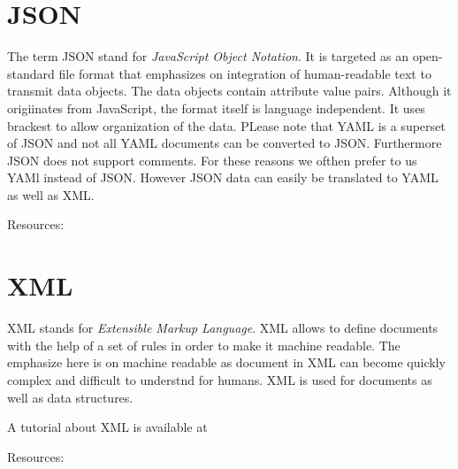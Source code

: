 

\section{JSON}

The term JSON stand for \emph{JavaScript Object Notation}. It is
targeted as an open-standard file format that emphasizes on
integration of human-readable text to transmit data objects.  The data
objects contain attribute value pairs. Although it origiinates from
JavaScript, the format itself is language independent. It uses
brackest to allow organization of the data. PLease note that YAML is a
superset of JSON and not all YAML documents can be converted to
JSON. Furthermore JSON does not support comments. For these reasons we
ofthen prefer to us YAMl instead of JSON. However JSON data can easily
be translated to YAML as well as XML.

Resources:



\section{XML}

XML stands for \emph{Extensible Markup Language}. XML allows to define
documents with the help of a set of rules in order to make it machine
readable. The emphasize here is on machine readable as document in XML can become
quickly complex and difficult to understnd for humans. XML is used for
documents as well as data structures.

A tutorial about XML is available at 


Resources:

